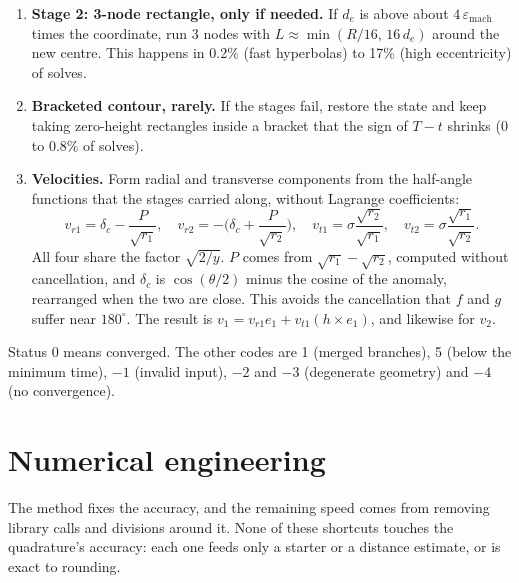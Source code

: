 \documentclass[11pt]{article}
\begin{document}
\begin{enumerate}
  \item \textbf{Stage 2: 3-node rectangle, only if needed.} If $d_e$ is above about $4\,\varepsilon_\text{mach}$ times the coordinate, run 3 nodes with $L\approx\min(R/16,\,16\,d_e)$ around the new centre. This happens in 0.2\% (fast hyperbolas) to 17\% (high eccentricity) of solves.
  \item \textbf{Bracketed contour, rarely.} If the stages fail, restore the state and keep taking zero-height rectangles inside a bracket that the sign of $T-t$ shrinks (0 to 0.8\% of solves).
  \item \textbf{Velocities.} Form radial and transverse components from the half-angle functions that the stages carried along, without Lagrange coefficients:
  \[
    v_{r1} = \delta_c - \frac{P}{\sqrt{r_1}}, \quad
    v_{r2} = -\Big(\delta_c + \frac{P}{\sqrt{r_2}}\Big), \quad
    v_{t1} = \sigma\frac{\sqrt{r_2}}{\sqrt{r_1}}, \quad
    v_{t2} = \sigma\frac{\sqrt{r_1}}{\sqrt{r_2}}.
  \]
  All four share the factor $\sqrt{2/y}$. $P$ comes from $\sqrt{r_1}-\sqrt{r_2}$, computed without cancellation, and $\delta_c$ is $\cos(\theta/2)$ minus the cosine of the anomaly, rearranged when the two are close. This avoids the cancellation that $f$ and $g$ suffer near $180^\circ$. The result is $v_1 = v_{r1}e_1 + v_{t1}(h\times e_1)$, and likewise for $v_2$.
\end{enumerate}

Status 0 means converged. The other codes are 1 (merged branches), 5 (below the minimum time), $-1$ (invalid input), $-2$ and $-3$ (degenerate geometry) and $-4$ (no convergence).

\section{Numerical engineering}

The method fixes the accuracy, and the remaining speed comes from removing library calls and divisions around it. None of these shortcuts touches the quadrature's accuracy: each one feeds only a starter or a distance estimate, or is exact to rounding.
\end{document}
